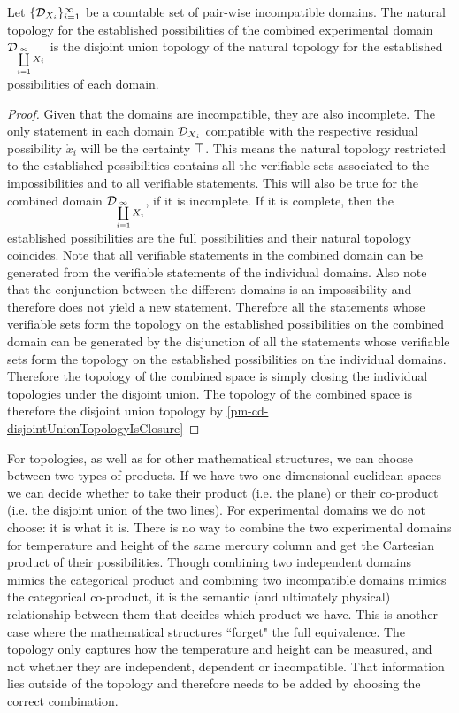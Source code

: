 \begin{mathSection}
	\begin{prop}
		Let $\{\mathcal{D}_{X_i}\}_{i=1}^{\infty}$ be a countable set of pair-wise incompatible domains. The natural topology for the established possibilities of the combined experimental domain $\mathcal{D}_{\coprod\limits_{i=1}^{\infty} X_i}$ is the disjoint union topology of the natural topology for the established possibilities of each domain.
	\end{prop}
	\begin{proof}
		Given that the domains are incompatible, they are also incomplete. The only statement in each domain $\mathcal{D}_{X_i}$ compatible with the respective residual possibility $\mathring{x}_i$ will be the certainty $\top$. This means the natural topology restricted to the established possibilities contains all the verifiable sets associated to the impossibilities and to all verifiable statements. This will also be true for the combined domain $\mathcal{D}_{\coprod\limits_{i=1}^{\infty} X_i}$, if it is incomplete. If it is complete, then the established possibilities are the full possibilities and their natural topology coincides. Note that all verifiable statements in the combined domain can be generated from the verifiable statements of the individual domains. Also note that the conjunction between the different domains is an impossibility and therefore does not yield a new statement. Therefore all the statements whose verifiable sets form the topology on the established possibilities on the combined domain can be generated by the disjunction of all the statements whose verifiable sets form  the topology on the established possibilities on the individual domains. Therefore the topology of the combined space is simply closing the individual topologies under the disjoint union. The topology of the combined space is therefore the disjoint union topology by \ref{pm-cd-disjointUnionTopologyIsClosure}
	\end{proof}
\end{mathSection}

For topologies, as well as for other mathematical structures, we can choose between two types of products. If we have two one dimensional euclidean spaces we can decide whether to take their product (i.e. the plane) or their co-product (i.e. the disjoint union of the two lines). For experimental domains we do not choose: it is what it is. There is no way to combine the two experimental domains for temperature and height of the same mercury column and get the Cartesian product of their possibilities. Though combining two independent domains mimics the categorical product and combining two incompatible domains mimics the categorical co-product, it is the semantic (and ultimately physical) relationship between them that decides which product we have. This is another case where the mathematical structures ``forget" the full equivalence. The topology only captures how the temperature and height can be measured, and not whether they are independent, dependent or incompatible. That information lies outside of the topology and therefore needs to be added by choosing the correct combination.

